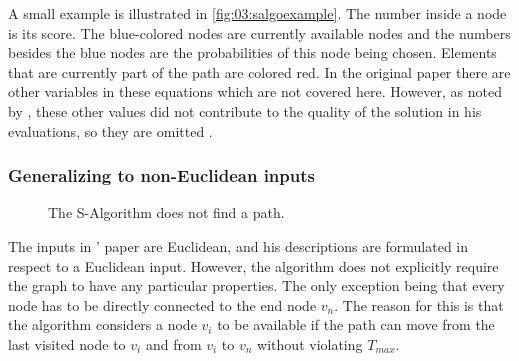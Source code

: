 A small example is illustrated in \cref{fig:03:salgoexample}.
The number inside a node is its score.
The blue-colored nodes are currently available nodes and the numbers besides the blue nodes are the probabilities of this node being chosen.
Elements that are currently part of the path are colored red.
In the original paper there are other variables in these equations which are not covered here.
However, as noted by \citeauthor{tsiligiridis_heuristic_1984}, these other values did not contribute to the quality of the solution in his evaluations, so they are omitted \cite{tsiligiridis_heuristic_1984}.

\subsubsection{Generalizing to non-Euclidean inputs}

\begin{wrapfigure}{l}{5.5cm}
	\centering
	\caption{The S-Algorithm does not find a path.}
	\label{fig:03:salgofailexample}
\end{wrapfigure}
The inputs in \citeauthor{tsiligiridis_heuristic_1984}' paper are Euclidean, and his descriptions are formulated in respect to a Euclidean input.
However, the algorithm does not explicitly require the graph to have any particular properties. The only exception being that every node has to be directly connected to the end node $v_n$.
The reason for this is that the algorithm considers a node $v_i$ to be available if the path can move from the last visited node to $v_i$ and from $v_i$ to $v_n$ without violating $T_{max}$.

